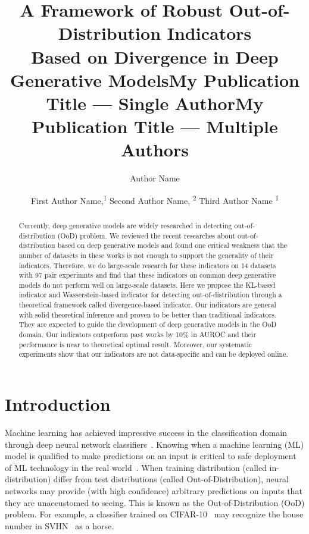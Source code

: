 \documentclass[letterpaper]{article} %
\title{A Framework of Robust Out-of-Distribution Indicators \\ Based on Divergence in Deep Generative Models}
\author{
}
\title{My Publication Title --- Single Author}
\author {
    Author Name \\
}
\title{My Publication Title --- Multiple Authors}
\author {

        First Author Name,\textsuperscript{\rm 1}
        Second Author Name, \textsuperscript{\rm 2}
        Third Author Name \textsuperscript{\rm 1} \\
}
\begin{document}
\linenumbers  %

\maketitle

\begin{abstract}

Currently, deep generative models are widely researched in detecting out-of-distribution (OoD) problem. We reviewed the recent researches about out-of-distribution based on deep generative models and found one critical weakness that the number of datasets in these works is not enough to support the generality of their indicators. 
Therefore, we do large-scale research for these indicators on 14 datasets with 97 pair experimnts and find that these indicators on common deep generative models do not perform well on large-scale datasets. 
Here we propose the KL-based indicator and Wasserstein-based indicator for detecting out-of-distribution through a theoretical framework called divergence-based indicator. 
Our indicators are general with solid theoretical inference and proven to be better than traditional indicators. They are expected to guide the development of deep generative models in the OoD domain. 
Our indicators outperform past works by 10\% in AUROC and their performance is near to theoretical optimal result. Moreover, our systematic experiments show that our indicators are not data-specific and can be deployed online. 
 
\end{abstract}

\section{Introduction}
Machine learning has achieved impressive success in the classification domain through deep neural network classifiers~\cite{szegedy2016inception,he2016deep,zagoruyko2016wide}. Knowing when a machine learning (ML) model is qualified to make predictions on an input is critical to safe deployment of ML technology in the real world~\cite{choi2018waic}. When training distribution (called in-distribution) differ from test distributions (called Out-of-Distribution), neural networks may provide (with high confidence) arbitrary predictions on inputs that they are unaccustomed to seeing. This is known as the Out-of-Distribution (OoD) problem\cite{choi2018waic}.
%
For example, a classifier trained on CIFAR-10~\cite{krizhevsky2009learning} may recognize the house number in SVHN~\cite{netzer2011reading} as a horse. 
\end{document}
